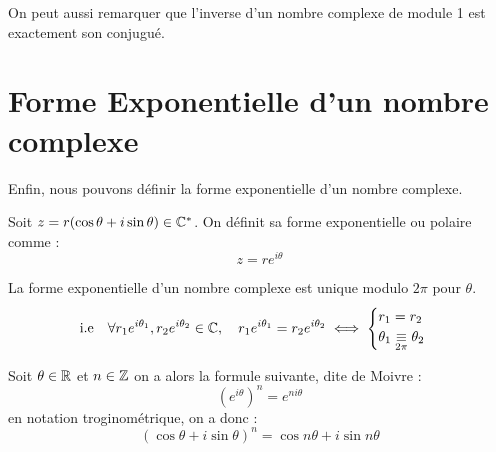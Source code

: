 \begin{remark}
    On peut aussi remarquer que l'inverse d'un nombre complexe de module 1 est exactement son conjugué. 
\end{remark}



\section{Forme Exponentielle d'un nombre complexe}

Enfin, nous pouvons définir la forme exponentielle d'un nombre complexe. 

\begin{definition}
    Soit $z = r (\cos \theta + i \sin \theta) \in \mathbb{C}^*$. On définit sa forme exponentielle ou polaire comme : 
        \[ z = r e^{i \theta} \] 
\end{definition}

\begin{remark}
    La forme exponentielle d'un nombre complexe est unique modulo $2 \pi$ pour $ \theta$. 
    \[ \text{i.e} \quad \forall r_1 e^{i\theta_1},  r_2 e^{i \theta_2} \in \mathbb{C}, \quad r_1 e^{i\theta_1} = r_2 e^{i \theta_2} \iff 
    \begin{cases}
        r_1 = r_2 \\ 
        \theta_1 \underset{2\pi}{\equiv } \theta_2 
    \end{cases} \] 
\end{remark}

\begin{prop}
    Soit $\theta \in \mathbb{R}$ et $ n \in \mathbb{Z}$ on a alors la formule suivante, dite de Moivre : 
        \[ \left(e^{i\theta} \right)^n = e^{ni\theta} \] 
    en notation troginométrique, on a donc : 
        \[ \left( \cos \theta + i \sin \theta \right)^n = \cos n\theta + i \sin n \theta \] 
\end{prop}

